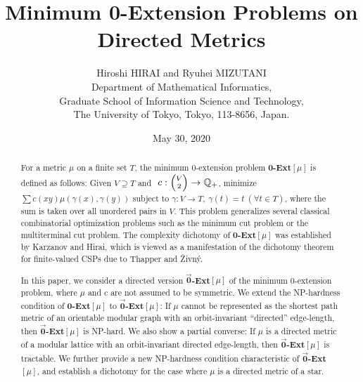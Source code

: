\documentclass[11pt]{article}
\title{Minimum 0-Extension Problems
on Directed Metrics}
\author{Hiroshi HIRAI and Ryuhei MIZUTANI\\
Department of Mathematical Informatics,\\
Graduate School of Information Science and Technology,\\
The University of Tokyo, Tokyo, 113-8656, Japan.}
\date{May 30, 2020}
\theoremstyle{definition}
\begin{document}
\maketitle

\begin{abstract}
For a metric $\mu$ on a finite set $T$, the minimum 0-extension problem \textbf{0-Ext}$[\mu]$ is defined as follows: Given $V\supseteq T$ and $\ c:{\scriptsize\begin{pmatrix}V \\
                     2 \\
\end{pmatrix}}\rightarrow \mathbb{Q}_+$, minimize $\sum c(xy)\mu(\gamma(x),\gamma(y))$ subject to $\gamma:V\rightarrow T,\ \gamma(t)=t\ (\forall t\in T)$, where the sum is taken over all unordered pairs in $V$. This problem generalizes several classical combinatorial optimization problems such as the minimum cut problem or the multiterminal cut problem. The complexity dichotomy of \textbf{0-Ext}$[\mu]$ was established by Karzanov and Hirai, which is viewed as a manifestation
of the dichotomy theorem for finite-valued CSPs due to Thapper and \v{Z}ivn\'{y}. 

In this paper, we consider a directed version
$\overrightarrow{\textbf{0}}$\textbf{-Ext}$[\mu]$ of the minimum 0-extension problem,
where $\mu$ and $c$ are not assumed to be symmetric.
We extend the NP-hardness condition of \textbf{0-Ext}$[\mu]$ 
to $\overrightarrow{\textbf{0}}$\textbf{-Ext}$[\mu]$: If $\mu$ cannot be represented as the
shortest path metric of
an orientable modular graph with an orbit-invariant ``directed'' edge-length,
then $\overrightarrow{\textbf{0}}$\textbf{-Ext}$[\mu]$ is NP-hard.
We also show a partial converse: If $\mu$ is a directed metric of
a modular lattice with an orbit-invariant directed edge-length,
then $\overrightarrow{\textbf{0}}$\textbf{-Ext}$[\mu]$ is tractable.
We further provide a new NP-hardness condition characteristic
of $\overrightarrow{\textbf{0}}$\textbf{-Ext}$[\mu]$, and establish
a dichotomy for the case where $\mu$ is a directed metric of a star.
\end{abstract}
\end{document}
